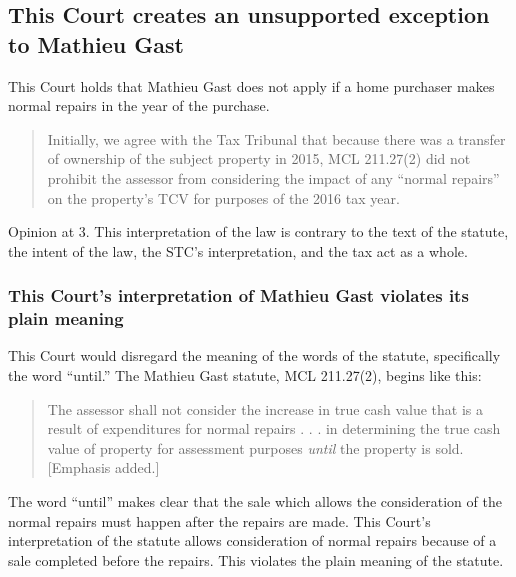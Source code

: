 \documentclass[12pt,\documentclassflag]{michiganCourtOfAppealsBrief}
\begin{document}
\subsection{This Court creates an unsupported exception to Mathieu Gast}

This Court holds that Mathieu Gast does not apply if a home purchaser makes normal repairs in the year of the purchase.

\begin{quote}
Initially, we agree with the Tax Tribunal that because there was a transfer of ownership of the
subject property in 2015, MCL 211.27(2) did not prohibit the assessor from considering the impact
of any ``normal repairs'' on the property's TCV for purposes of the 2016 tax year.
\end{quote}
Opinion at 3. This interpretation of the law is contrary to the text of the statute, the intent of the law, the STC's interpretation, and the tax act as a whole.

\subsubsection{This Court's interpretation of Mathieu Gast violates its plain meaning}

This Court would disregard the meaning of the words of the statute, specifically the word ``until.'' 
The Mathieu Gast statute, MCL 211.27(2), begins like this:

\begin{quote}
  The assessor shall not consider the increase in true cash value that is a result of expenditures for normal repairs . . . in determining the true cash value of property for assessment purposes \emph{until} the property is sold. [Emphasis added.]
\end{quote}

The word ``until'' makes clear that the sale which allows the consideration of the normal repairs must happen after the repairs are made. This Court's interpretation of the statute allows consideration of normal repairs because of a sale completed before the repairs. This violates the plain meaning of the statute.


\end{document}
